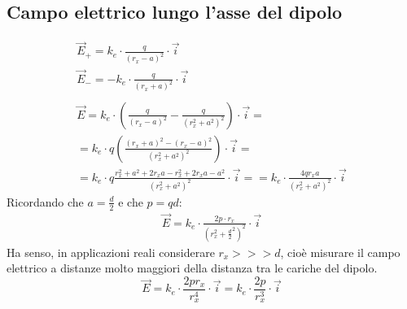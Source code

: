 \subsection{Campo elettrico lungo l'asse del dipolo}
\begin{displaymath}\begin{aligned}
	\vec{E}_+ = k_e \cdot \frac{q}{(r_x - a)^2} \cdot \vec{i}\\
    \vec{E}_- = - k_e \cdot \frac{q}{(r_x + a)^2} \cdot \vec{i}\\\\
    \vec{E} = k_e \cdot \left(\frac{q}{(r_x - a)^2} - \frac{q}{(r_x^2 + a^2)^2} \right) \cdot \vec{i} = \\
    = k_e \cdot q \left( \frac{(r_x + a)^2 - (r_x - a)^2}{(r_x^2 + a^2)^2} \right) \cdot \vec{i} = \\
    = k_e \cdot q \frac{r_x^2 + a^2 + 2 r_x a - r_x^2 +2 r_x a - a^2}{(r_x^2 + a^2)^2} \cdot \vec{i} = 
    = k_e \cdot \frac{4 q r_x a}{(r_x^2 + a^2)^2} \cdot \vec{i}
\end{aligned}\end{displaymath}
Ricordando che $a = \frac{d}{2}$ e che $p = qd$:
\begin{displaymath}\begin{aligned}
	\vec{E} = k_e \cdot \frac{2p\cdot r_x}{(r_x^2 + \frac{d}{2}^2)^2} \cdot \vec{i}    
\end{aligned}\end{displaymath}
Ha senso, in applicazioni reali considerare $r_x >>> d$, cioè misurare il campo elettrico a distanze molto maggiori della distanza tra le cariche del dipolo.
\begin{displaymath}
\vec{E} = k_e \cdot \frac{2 p r_x}{r_x^4} \cdot \vec{i} = k_e \cdot \frac{2p}{r_x^3} \cdot \vec{i}
\end{displaymath}

